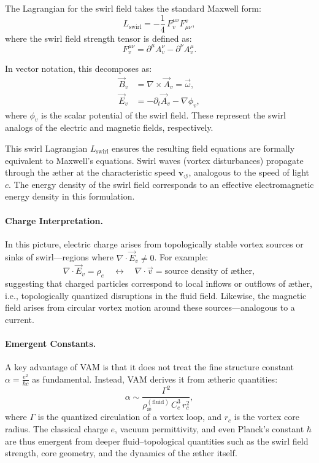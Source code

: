 \documentclass[a4paper,12pt]{article}
\begin{document}
The Lagrangian for the swirl field takes the standard Maxwell form:
\begin{equation}
    L_{\text{swirl}} = -\frac{1}{4}\, F_{v}^{\mu\nu} F^{v}_{\mu\nu},
    \label{eq:swirl-lagrangian}
\end{equation}
where the swirl field strength tensor is defined as:
\[
F_v^{\mu\nu} = \partial^\mu A_v^\nu - \partial^\nu A_v^\mu.
\]

In vector notation, this decomposes as:
\begin{align*}
    \vec{B}_v &= \nabla \times \vec{A}_v = \vec{\omega}, \\
    \vec{E}_v &= -\partial_t \vec{A}_v - \nabla \phi_v,
\end{align*}
where \( \phi_v \) is the scalar potential of the swirl field. These represent the swirl analogs of the electric and magnetic fields, respectively.

\vspace{1em}
This swirl Lagrangian \( L_{\text{swirl}} \) ensures the resulting field equations are formally equivalent to Maxwell's equations. Swirl waves (vortex disturbances) propagate through the æther at the characteristic speed \( \mathbf{v}_{\scriptscriptstyle\boldsymbol{\circlearrowleft}} \), analogous to the speed of light \( c \). The energy density of the swirl field corresponds to an effective electromagnetic energy density in this formulation.

\paragraph{Charge Interpretation.} In this picture, electric charge arises from topologically stable vortex sources or sinks of swirl—regions where \( \nabla \cdot \vec{E}_v \neq 0 \). For example:
\[
\nabla \cdot \vec{E}_v = \rho_e \quad \leftrightarrow \quad \nabla \cdot \vec{v} = \text{source density of æther},
\]
suggesting that charged particles correspond to local inflows or outflows of æther, i.e., topologically quantized disruptions in the fluid field. Likewise, the magnetic field arises from circular vortex motion around these sources—analogous to a current.

\vspace{1em}
\paragraph{Emergent Constants.} A key advantage of VAM is that it does not treat the fine structure constant \( \alpha = \frac{e^2}{\hbar c} \) as fundamental. Instead, VAM derives it from ætheric quantities:
\[
\alpha \sim \frac{\Gamma^2}{\rho_{\text{\ae}}^{(\text{fluid})} \, C_e^3 \, r_c^2},
\]
where \( \Gamma \) is the quantized circulation of a vortex loop, and \( r_c \) is the vortex core radius. The classical charge \( e \), vacuum permittivity, and even Planck’s constant \( \hbar \) are thus emergent from deeper fluid–topological quantities such as the swirl field strength, core geometry, and the dynamics of the æther itself.
\end{document}
